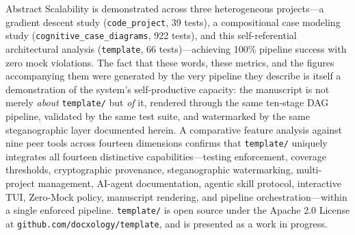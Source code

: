 \documentclass[
  ignorenonframetext,
]{beamer}
\begin{document}
\begin{frame}[fragile]{Abstract}
Scalability is demonstrated across three heterogeneous projects---a
gradient descent study (\texttt{code\_project}, 39 tests), a
compositional case modeling study (\texttt{cognitive\_case\_diagrams},
922 tests), and this self-referential architectural analysis
(\texttt{template}, 66 tests)---achieving 100\% pipeline success with
zero mock violations. The fact that these words, these metrics, and the
figures accompanying them were generated by the very pipeline they
describe is itself a demonstration of the system's self-productive
capacity: the manuscript is not merely \emph{about} \texttt{template/}
but \emph{of} it, rendered through the same ten-stage DAG pipeline,
validated by the same test suite, and watermarked by the same
steganographic layer documented herein. A comparative feature analysis
against nine peer tools across fourteen dimensions confirms that
\texttt{template/} uniquely integrates all fourteen distinctive
capabilities---testing enforcement, coverage thresholds, cryptographic
provenance, steganographic watermarking, multi-project management,
AI-agent documentation, agentic skill protocol, interactive TUI,
Zero-Mock policy, manuscript rendering, and pipeline
orchestration---within a single enforced pipeline. \texttt{template/} is
open source under the Apache 2.0 License at
\texttt{github.com/docxology/template}, and is presented as a work in
progress.~
\end{frame}
\end{document}
